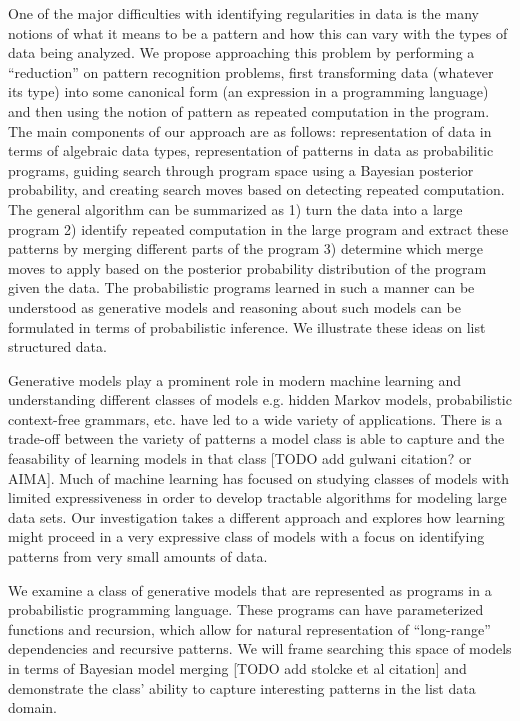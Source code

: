 \documentclass[a4paper,10pt]{article}
\begin{document}
One of the major difficulties with identifying regularities in data is the many notions of what it means to be a pattern and how this can vary with the types of data being analyzed.   We propose approaching this problem by performing a ``reduction'' on pattern recognition problems, first transforming data (whatever its type) into some canonical form (an expression in a programming language) and then using the notion of pattern as repeated computation in the program.  The main components of our approach are as follows: representation of data in terms of algebraic data types, representation of patterns in data as probabilitic programs, guiding search through program space using a Bayesian posterior probability, and creating search moves based on detecting repeated computation.  The general algorithm can be summarized as 1) turn the data into a large program 2) identify repeated computation in the large program and extract these patterns by merging different parts of the program 3) determine which merge moves to apply based on the posterior probability distribution of the program given the data.  The probabilistic programs learned in such a manner can be understood as generative models and reasoning about such models can be formulated in terms of probabilistic inference.  We illustrate these ideas on list structured data.  

Generative models play a prominent role in modern machine learning and understanding different classes of models e.g. hidden Markov models, probabilistic context-free grammars, etc. have led to a wide variety of applications.  There is a trade-off between the variety of patterns a model class is able to capture and the feasability of learning models in that class [TODO add gulwani citation? or AIMA].  Much of machine learning has focused on studying classes of models with limited expressiveness in order to develop tractable algorithms for modeling large data sets.  Our investigation takes a different approach and explores how learning might proceed in a very expressive class of models with a focus on identifying patterns from very small amounts of data.  

We examine a class of generative models that are represented as programs in a probabilistic programming language.  These programs can have parameterized functions and recursion, which allow for natural representation of ``long-range'' dependencies and recursive patterns.  We will frame searching this space of models in terms of Bayesian model merging [TODO add stolcke et al citation] and demonstrate the class' ability to capture interesting patterns in the list data domain.
\end{document}
